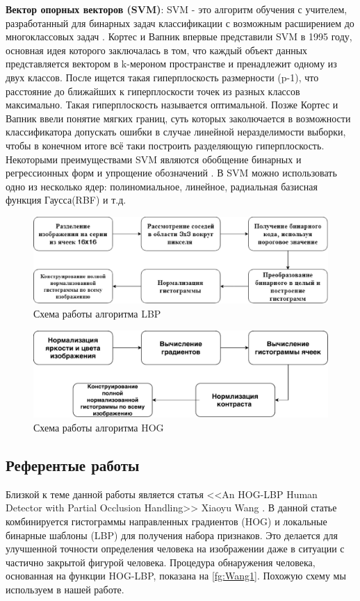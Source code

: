 \documentclass[12pt,twoside]{article}
\begin{document}
\textbf{Вектор опорных векторов (SVM)}: SVM - это алгоритм обучения с учителем, разработанный для бинарных задач классификации с возможным расширением до многоклассовых задач \cite{Begg}. Кортес и Вапник впервые представили SVM в 1995 году, основная идея которого заключалась в том, что каждый объект данных представляется вектором в k-мероном пространстве и пренадлежит одному из двух классов. После ищется такая гиперплоскость размерности (p-1), что расстояние до ближайших к гиперплоскости точек из разных классов максимально. Такая гиперплоскость называется оптимальной. Позже Кортес и Вапник ввели понятие мягких границ, суть которых заколючается в возможности классификатора допускать ошибки в случае линейной неразделимости выборки, чтобы в конечном итоге всё таки построить разделяющую гиперплоскость\cite{Cortes}. Некоторыми преимуществами SVM являются обобщение бинарных и регрессионных форм и упрощение обозначений \cite{Begg}. В SVM можно использовать одно из несколько ядер: полиномиальное, линейное, радиальная базисная функция Гаусса(RBF) \cite{Schlkopf} и т.д.
\begin{figure}[H]
	\includegraphics[width=1\textwidth]{LBP}
	\caption{Схема работы алгоритма LBP\cite{Comparing}}
	\label{fg:LBP}
\end{figure}

\begin{figure}[H]
	\includegraphics[width=1\textwidth]{HOG}
	\caption{Схема работы алгоритма HOG \cite{Comparing} }
	\label{fg:HOG}
\end{figure}

\subsection{Референтые работы}
Близкой к теме данной работы является статья <<An HOG-LBP Human Detector with Partial Occlusion Handling>> Xiaoyu Wang \cite{Wang09}. В данной статье комбинируется гистограммы направленных градиентов (HOG) и локальные бинарные шаблоны (LBP) для получения набора признаков. Это делается для улучшенной точности определения человека на изображении даже в ситуации с частично закрытой фигурой человека. Процедура обнаружения человека, основанная на функции HOG-LBP, показана на \ref{fg:Wang1}. Похожую схему мы используем в нашей работе. 
\end{document}
